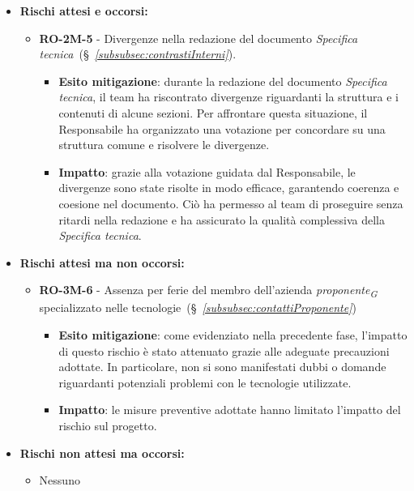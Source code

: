 \begin{itemize}
    \item \textbf{Rischi attesi e occorsi:}
        \begin{itemize}
            \item \textbf{RO-2M-5} - Divergenze nella redazione del documento \textit{Specifica tecnica}~(\S~\textit{\ref{subsubsec:contrastiInterni}}).
            \begin{itemize}
                \item \textbf{Esito mitigazione}: durante la redazione del documento \textit{Specifica tecnica}, il team ha riscontrato divergenze riguardanti la struttura e i contenuti di alcune sezioni. Per affrontare questa situazione, il Responsabile ha organizzato una votazione per concordare su una struttura comune e risolvere le divergenze.
                \item \textbf{Impatto}: grazie alla votazione guidata dal Responsabile, le divergenze sono state risolte in modo efficace, garantendo coerenza e coesione nel documento. Ciò ha permesso al team di proseguire senza ritardi nella redazione e ha assicurato la qualità complessiva della \textit{Specifica tecnica}.
            \end{itemize}
            
        \end{itemize}
    \item \textbf{Rischi attesi ma non occorsi:}
        \begin{itemize}
            \item \textbf{RO-3M-6} - Assenza per ferie del membro dell'azienda \textit{proponente}\textsubscript{\textit{G}} specializzato nelle tecnologie~(\S~\textit{\ref{subsubsec:contattiProponente}})
                \begin{itemize}
                    \item \textbf{Esito mitigazione}: come evidenziato nella precedente fase, l'impatto di questo rischio è stato attenuato grazie alle adeguate precauzioni adottate. In particolare, non si sono manifestati dubbi o domande riguardanti potenziali problemi con le tecnologie utilizzate.
                    \item \textbf{Impatto}: 
                    le misure preventive adottate hanno limitato l'impatto del rischio sul progetto.
                \end{itemize}
        \end{itemize}
    \item \textbf{Rischi non attesi ma occorsi:}
        \begin{itemize}
            \item Nessuno
        \end{itemize}
\end{itemize}


